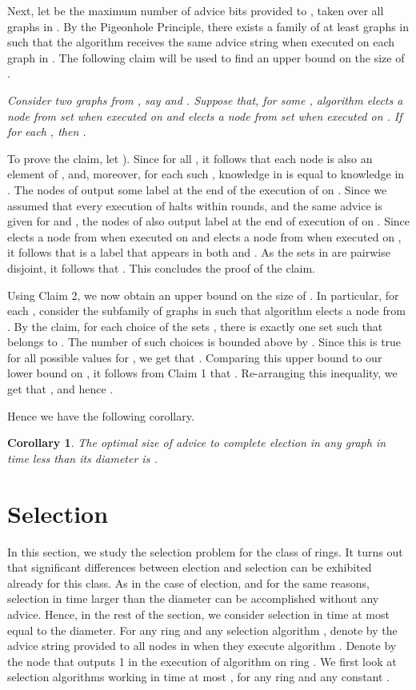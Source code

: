 \documentclass[11pt]{article}
\newtheorem{corollary}{Corollary}[section]
\newcommand{\qed}{\hfill  \bigbreak}
\newenvironment{proof}{\noindent {\bf Proof.}}{\qed}
\begin{document}
\begin{proof}
Next, let  be the maximum number of advice bits provided to , taken over all graphs in . By the Pigeonhole Principle, there exists a family  of at least  graphs in  such that the algorithm receives the same advice string when executed on each graph in .
The following claim will be used to find an upper bound on the size of . 

\vspace{3mm} 
\textit{Consider two graphs from , say  and . Suppose that, for some , algorithm  elects a node from set  when executed on  and elects a node from set  when executed on . If  for each , then .}
\vspace{3mm}

To prove the claim, let ).
Since  for all , it follows that each node  is also an element of , and, moreover, for each such ,
knowledge  in  is equal to knowledge  in .
The nodes of  output some label  at the end of the execution of  on .
Since we assumed that every execution of  halts within  rounds, and the same advice is given for  and , 
the nodes of  also output label  at the end of execution of  on . Since  elects a node from  when executed on  and elects a node from  when executed on , it follows that  is a label that appears in both  and . As the sets in  are pairwise disjoint, it follows that . This concludes the proof of the claim.

Using Claim 2, we now obtain an upper bound on the size of . In particular, for each , consider the subfamily of graphs  in  such that algorithm  elects a node from . By the claim, for each choice of the  sets , there is exactly one set  such that  belongs to . The number of such choices is bounded above by . Since this is true for all  possible values for , we get that . Comparing this upper bound to our lower bound on , it follows from Claim 1 that . Re-arranging this inequality, we get that , and hence .
\end{proof}

Hence we have the following corollary.

\begin{corollary}
The optimal size of advice to complete election in any graph in time less than its diameter is .
\end{corollary}

 
\section{Selection}

In this section, we study the selection problem for the class of rings. It turns out that significant differences between election and selection can be exhibited
already for this class. As in the case of election, and for the same reasons, selection in time larger than the diameter can be accomplished without any advice. Hence, in the rest of the section, we consider selection in time at most equal to the diameter. 
For any ring  and any selection algorithm , denote by  the advice string provided to all nodes in  when they execute algorithm . Denote by  the node that outputs 1 in the execution of algorithm  on ring .
We first look at selection algorithms working in time at most , for any ring  and any constant .
\end{document}
